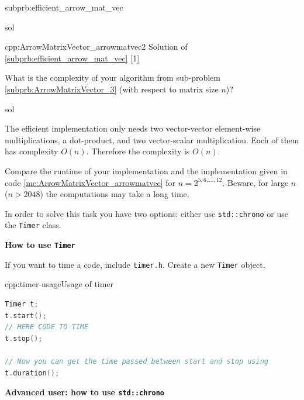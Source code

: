 \begin{samproblem}
\begin{subproblem}{subprb:efficient_arrow_mat_vec}
\begin{samwriteprbpart}{sol}
\begin{samsolution}
\begin{samcode}[C++11-code]
  {cpp:ArrowMatrixVector_arrowmatvec2}
  {Solution of \ref{subprb:efficient_arrow_mat_vec}}
[1]
\end{samcode}

\end{samsolution}
\end{samwriteprbpart}
\end{subproblem}

\begin{subproblem}{}
What is the complexity of your algorithm from sub-problem
\ref{subprb:ArrowMatrixVector_3} (with respect to matrix size $n$)?
 \begin{samwriteprbpart}{sol}
\begin{samsolution}
  The efficient implementation only needs two vector-vector element-wise
  multiplications, a dot-product, and
  two vector-scalar multiplication. Each of them has complexity $O(n)$.
  Therefore the complexity is $O(n)$.
\end{samsolution}
\end{samwriteprbpart}
\end{subproblem}


\begin{subproblem}{}
  Compare the runtime of your implementation and the implementation given in code
  \ref{mc:ArrowMatrixVector_arrowmatvec} for $n=2^{5,6,\ldots,12}$.
  Beware, for large $n$ ($n > 2048$) the computations may take a long time.

  In order to solve this task you have two options: either use \texttt{std::chrono} or use the \texttt{Timer} class.

  \textbf{How to use \texttt{Timer}}

  If you want to time a code, include \texttt{timer.h}.
  Create a new \texttt{Timer} object.
  \begin{samcode}[C++11-code]{cpp:timer-usage}{Usage of timer}
    \begin{lstlisting}[language=C++, style=cpp]
Timer t;
t.start();
// HERE CODE TO TIME
t.stop();

// Now you can get the time passed between start and stop using
t.duration();
    \end{lstlisting}
  \end{samcode}

  \textbf{Advanced user: how to use \texttt{std::chrono}}


\end{subproblem}
\end{samproblem}
